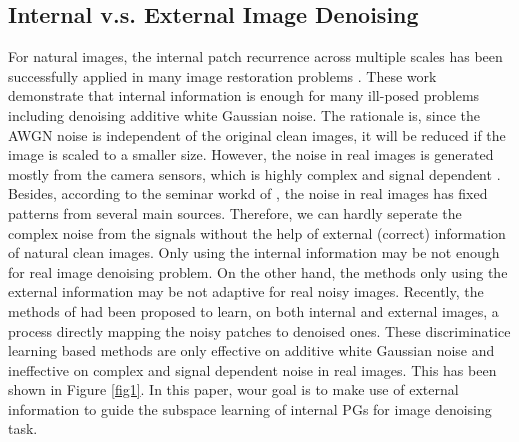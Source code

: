 \documentclass[10pt,twocolumn,letterpaper]{article}
\begin{document}
\subsection{Internal v.s. External Image Denoising}
For natural images, the internal patch recurrence across multiple scales has been successfully applied in many image restoration problems \cite{Irani2009sr,Irani2013separating,Irani2014deblur,Irani2016dehazing}. These work demonstrate that internal information is enough for many ill-posed problems including denoising additive white Gaussian noise. The rationale is, since the AWGN noise is independent of the original clean images, it will be reduced if the image is scaled to a smaller size. However, the noise in real images is generated mostly from the camera sensors, which is highly complex and signal dependent \cite{crosschannel2016}. Besides, according to the seminar workd of \cite{healey1994radiometric}, the noise in real images has fixed patterns from several main sources. Therefore, we can hardly seperate the complex noise from the signals without the help of external (correct) information of natural clean images. Only using the internal information may be not enough for real image denoising problem. On the other hand, the methods only using the external information may be not adaptive for real noisy images. Recently, the methods of \cite{mlp,csf,chen2015learning} had been proposed to learn, on both internal and external images, a process directly mapping the noisy patches to denoised ones. These discriminatice learning based methods are only effective on additive white Gaussian noise and ineffective on complex and signal dependent noise in real images. This has been shown in Figure \ref{fig1}. In this paper, wour goal is to make use of external information to guide the subspace learning of internal PGs for image denoising task.
\end{document}
